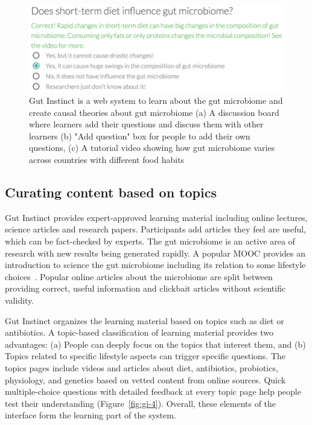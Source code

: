 \begin{figure}[h] 
  \centering
  \includegraphics[width=1.0\textwidth]{figures/gutinstinct/gi-3.png}
  \caption[Gut Instinct is a web system to learn about the gut microbiome and create causal theories about gut microbiome]
{ Gut Instinct is a web system to learn about the gut microbiome and create causal theories about gut microbiome (a) A discussion board where learners add their questions and discuss them with other learners (b) "Add question" box for people to add their own questions, (c) A tutorial video showing how gut microbiome varies across countries with different food habits~\cite{Yatsunenko2012}}
  \label{fig:gi-3}
\end{figure}

\subsection{Curating content based on topics}
Gut Instinct provides expert-approved learning material including online lectures, science articles and research papers. Participants add articles they feel are useful, which can be fact-checked by experts. The gut microbiome is an active area of research with new results being generated rapidly. A popular MOOC provides an introduction to science the gut microbiome including its relation to some lifestyle choices~\cite{Knight2016}. Popular online articles about the microbiome are split between providing correct, useful information and clickbait articles without scientific validity.


Gut Instinct organizes the learning material based on topics such as diet or antibiotics. A topic-based classification of learning material provides two advantages: (a) People can deeply focus on the topics that interest them, and (b) Topics related to specific lifestyle aspects can trigger specific questions. The topics pages include videos and articles about diet, antibiotics, probiotics, physiology, and genetics based on vetted content from online sources. Quick multiple-choice questions with detailed feedback at every topic page help people test their understanding (Figure~\ref{fig:gi-4}). Overall, these elements of the interface form the learning part of the system.

